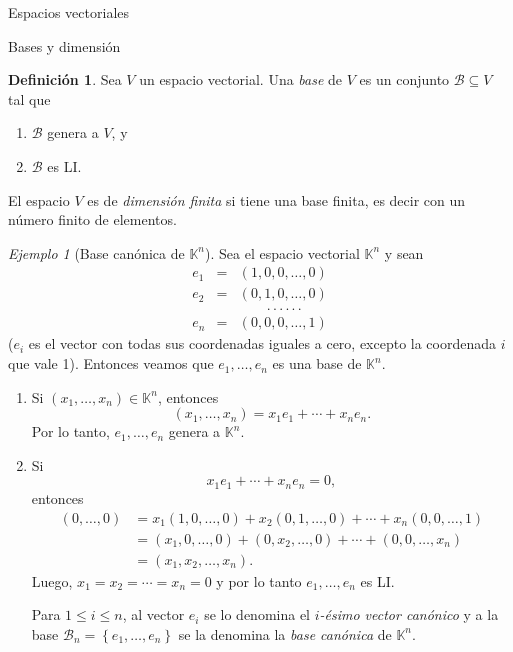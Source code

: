 \documentclass[a4paper,12pt,twoside,spanish,reqno]{amsbook}
\numberwithin{equation}{section}
\theoremstyle{definition}
\newtheorem{definicion}[teorema]{Definici\'on}
\theoremstyle{remark}
\newtheorem*{ejemplo*}{Ejemplo}
\newcommand{\K}{\mathbb K}
\begin{document}
\begin{chapter}{Espacios vectoriales}
\begin{section}{Bases y dimensión}
 \begin{definicion}
     Sea $V$ un espacio vectorial. Una \textit{base} de $V$ es un conjunto $\mathcal B \subseteq V$ tal que
     \begin{enumerate}
         \item $\mathcal B$ genera a $V$, y
         \item $\mathcal B$ es LI.
     \end{enumerate}
      El espacio $V$ es de \textit{dimensión finita} si tiene una base finita,  es decir con  un número finito de elementos.
 \end{definicion}



\begin{ejemplo*}[{\sc Base canónica de $\K^n$}] Sea el espacio vectorial $\K^n$ y sean
    \begin{equation*}
    \begin{array}{rcl}
    e_1 &=& (1,0,0,\ldots,0) \\
    e_2 &=& (0,1,0,\ldots,0) \\
    &&\qquad.\,.\,.\,.\,.\,.\,\\ 
    e_n&=& (0,0,0,\ldots,1)
    \end{array}
    \end{equation*}
    ($e_i$ es el vector con todas sus coordenadas iguales a cero,  excepto  la coordenada $i$ que vale 1). Entonces veamos que  $e_1,\ldots,e_n$ es una base de $\K^n$.
    \begin{enumerate}
        \item Si $(x_1,\ldots,x_n) \in \K^n$,  entonces
        $$
        (x_1,\ldots,x_n) = x_1e_1+\cdots+x_ne_n.
        $$
        Por lo tanto, $e_1,\ldots,e_n$ genera a  $\K^n$.
        \item Si 
        $$
        x_1e_1+\cdots+x_ne_n =0,
        $$
        entonces
        \begin{align*}
            (0,\ldots,0) &= x_1(1,0,\ldots,0)+ x_2(0,1,\ldots,0)+\cdots+x_n(0,0,\ldots,1)\\ 
            &=  (x_1,0,\ldots,0)+(0,x_2,\ldots,0)+\cdots+(0,0,\ldots,x_n)\\ &= (x_1,x_2,\ldots,x_n).
        \end{align*}
        Luego, $x_1= x_2=\cdots=x_n =0$ y por lo tanto $e_1,\ldots,e_n$ es LI.
        
        Para $1 \le i \le n$, al vector $e_i$ se lo denomina el \textit{$i$-ésimo vector canónico}  y a la base $\mathcal B_n = \left\{e_1,\ldots,e_n \right\}$ se la denomina la \textit{base canónica} de $\K^n$. 
        

\end{enumerate}
\end{ejemplo*}
\end{section}
\end{chapter}
\end{document}
